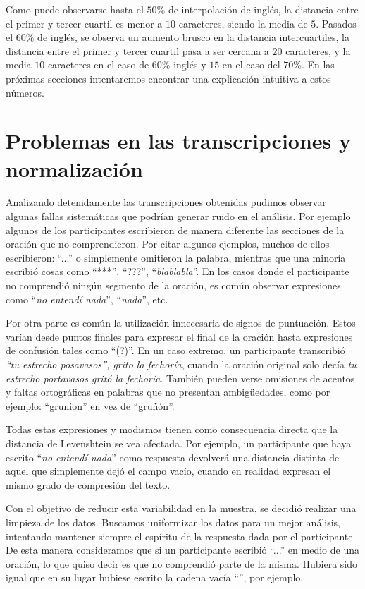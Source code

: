 Como puede observarse hasta el $50\%$ de interpolación de inglés, la distancia entre el primer y tercer cuartil es menor a $10$ caracteres, siendo la media de $5$. Pasados el $60\%$ de inglés, se observa un aumento brusco en la distancia intercuartiles, la distancia entre el primer y tercer cuartil pasa a ser cercana a $20$ caracteres, y la media $10$ caracteres en el caso de $60\%$ inglés y $15$ en el caso del $70\%$. En las próximas secciones intentaremos encontrar una explicación intuitiva a estos números.

\section{Problemas en las transcripciones y normalización}

Analizando detenidamente las transcripciones obtenidas pudimos observar algunas fallas sistemáticas que podrían generar ruido en el análisis. Por ejemplo algunos de los participantes escribieron de manera diferente las secciones de la oración que no comprendieron. Por citar algunos ejemplos, muchos de ellos escribieron: ``...'' o simplemente omitieron la palabra, mientras que una minoría escribió cosas como ``***'', ``???'', ``\textit{blablabla}''. En los casos donde el participante no comprendió ningún segmento de la oración, es común observar expresiones como ``\textit{no entendí nada}'', ``\textit{nada}'', etc.

Por otra parte es común la utilización innecesaria de signos de puntuación. Estos varían desde puntos finales para expresar el final de la oración hasta expresiones de confusión tales como ``(?)''. En un caso extremo, un participante transcribió \textit{``tu estrecho posavasos'', grito la fechoría}, cuando la oración original solo decía \textit{tu estrecho portavasos gritó la fechoría}.
También pueden verse omisiones de acentos y faltas ortográficas en palabras que no presentan ambigüedades, como por ejemplo: ``grunion'' en vez de ``gruñón''.

Todas estas expresiones y modismos tienen como consecuencia directa que la distancia de Levenshtein se vea afectada. Por ejemplo, un participante que haya escrito ``\textit{no entendí nada}'' como respuesta devolverá una distancia distinta de aquel que simplemente dejó el campo vacío, cuando en realidad expresan el mismo grado de compresión del texto.

Con el objetivo de reducir esta variabilidad en la muestra, se decidió realizar una limpieza de los datos. Buscamos uniformizar los datos para un mejor análisis, intentando mantener siempre el espíritu de la respuesta dada por el participante. De esta manera consideramos que si un participante escribió ``...'' en medio de una oración, lo que quiso decir es que no comprendió parte de la misma. Hubiera sido igual que en su lugar hubiese escrito la cadena vacía ``'', por ejemplo.

